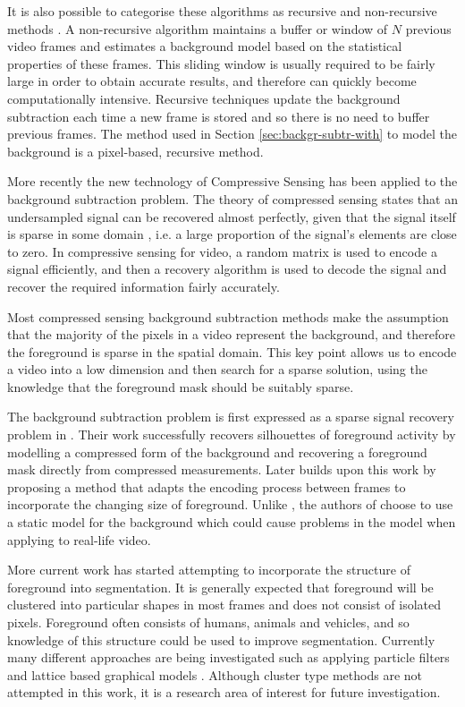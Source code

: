 \documentclass[conference]{IEEEtran}
\begin{document}
It is also possible to categorise these algorithms as recursive and non-recursive methods \cite{Bouwmans2011}. A non-recursive algorithm maintains a buffer or window of $N$ previous video frames and estimates a background model based on the statistical properties of these frames. This sliding window is usually required to be fairly large in order to obtain accurate results, and therefore can quickly become computationally intensive. Recursive techniques update the background subtraction each time a new frame is stored and so there is no need to buffer previous frames. The method used in Section \ref{sec:backgr-subtr-with} to model the background is a pixel-based, recursive method.

More recently the new technology of Compressive Sensing \cite{Candes2006, Candes2006a, Donoho2006} has been applied to the background subtraction problem. The theory of compressed sensing states that an undersampled signal can be recovered almost perfectly, given that the signal itself is sparse in some domain \cite{Baraniuk2007}, i.e. a large proportion of the signal's elements are close to zero. In compressive sensing for video, a random matrix is used to encode a signal efficiently, and then a recovery algorithm is used to decode the signal and recover the required information fairly accurately. 

Most compressed sensing background subtraction methods \cite{Cevher2008a, Cevher2008b, Warnell2011, Cossalter2009} make the assumption that the majority of the pixels in a video represent the background, and therefore the foreground is sparse in the spatial domain. This key point allows us to encode a video into a low dimension and then search for a sparse solution, using the knowledge that the foreground mask should be suitably sparse. 

The background subtraction problem is first expressed as a sparse signal recovery problem in \cite{Cevher2008b}. Their work successfully recovers silhouettes of foreground activity by modelling a compressed form of the background and recovering a foreground mask directly from compressed measurements. Later \cite{Warnell2011} builds upon this work by proposing a method that adapts the encoding process between frames to incorporate the changing size of foreground. Unlike \cite{Cevher2008b}, the authors of \cite{Warnell2011} choose to use a static model for the background which could cause problems in the model when applying to real-life video. 

More current work has started attempting to incorporate the structure of foreground into segmentation. It is generally expected that foreground will be clustered into particular shapes in most frames and does not consist of isolated pixels. Foreground often consists of humans, animals and vehicles, and so knowledge of this structure could be used to improve segmentation. Currently many different approaches are being investigated such as applying particle filters \cite{Cossalter2009} and lattice based graphical models \cite{Cevher2008a}. Although cluster type methods are not attempted in this work, it is a research area of interest for future investigation. 
\end{document}
